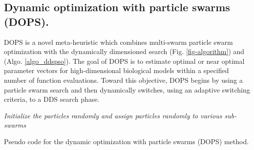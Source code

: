 \documentclass{bmcart}
\begin{document}
\subsection*{Dynamic optimization with particle swarms (DOPS).}
DOPS is a novel meta-heuristic which combines multi-swarm particle swarm optimization
with the dynamically dimensioned search (Fig. \ref{fig-algorithm}) and (Algo. \ref{algo_ddspso}).
The goal of DOPS is to estimate optimal or near optimal parameter vectors for high-dimensional biological models within a specified number of function evaluations.
Toward this objective, DOPS begins by using a particle swarm search and then dynamically switches, using an adaptive switching criteria, to a DDS search phase.

\IncMargin{1em}
\begin{algorithm}
\BlankLine
\emph{Initialize the particles randomly and assign particles randomly to various sub-swarms}\;
\caption{Pseudo code for the dynamic optimization with particle swarms (DOPS) method.}\label{algo_ddspso}
\end{algorithm}\DecMargin{1em}
\end{document}
